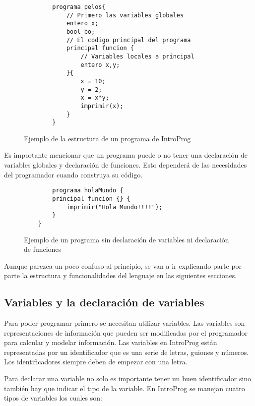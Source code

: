 \begin{figure}[!htbp]
    \centering
    
    \begin{lstlisting}
        programa pelos{
            // Primero las variables globales
            entero x;
            bool bo;
            // El codigo principal del programa
            principal funcion {
                // Variables locales a principal
                entero x,y;
            }{
                x = 10;
                y = 2;
                x = x*y;
                imprimir(x);
            }
        }
    \end{lstlisting}
    \caption{Ejemplo de la estructura de un programa de IntroProg}
\end{figure}
\FloatBarrier

Es importante mencionar que un programa puede o no tener una declaración de variables globales y declaración de funciones. Esto dependerá de las necesidades del programador cuando construya su código.

\begin{figure}[!htbp]
    \centering
    
    \begin{lstlisting}
        programa holaMundo { 
	    principal funcion {} {
		    imprimir("Hola Mundo!!!!");
	    } 
    }
    \end{lstlisting}
    \caption{Ejemplo de un programa sin declaración de variables ni declaración de funciones}
\end{figure}
\FloatBarrier

Aunque parezca un poco confuso al principio, se van a ir explicando parte por parte la estructura y funcionalidades del lenguaje en las siguientes secciones.

\subsection{Variables y la declaración de variables}

Para poder programar primero se necesitan utilizar variables. Las variables son representaciones de información que pueden ser modificadas por el programador para calcular y modelar información. Las variables en IntroProg están representadas por un identificador que es una serie de letras, guiones y números. Los identificadores siempre deben de empezar con una letra.

Para declarar una variable no solo es importante tener un buen identificador sino también hay que indicar el tipo de la variable. En IntroProg se manejan cuatro tipos de variables los cuales son:

